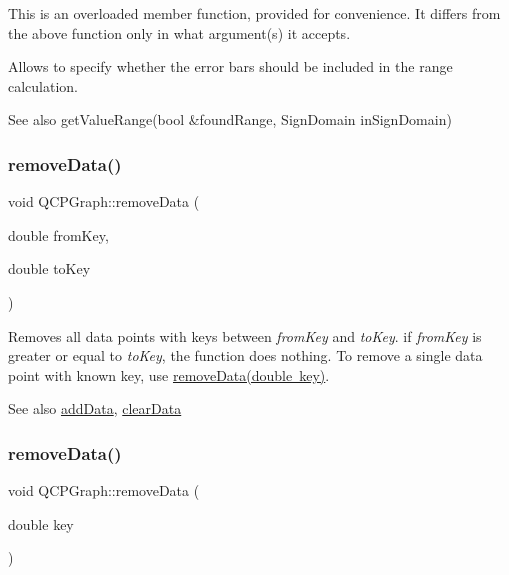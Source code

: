 This is an overloaded member function, provided for convenience. It differs from the above function only in what argument(s) it accepts.

Allows to specify whether the error bars should be included in the range calculation.

\begin{DoxySeeAlso}{See also}
get\+Value\+Range(bool \&found\+Range, Sign\+Domain in\+Sign\+Domain) 
\end{DoxySeeAlso}
\mbox{\label{class_q_c_p_graph_a4a0fde50b7db9db0a85b5c5b6b10098f}} 
\subsubsection{\texorpdfstring{remove\+Data()}{removeData()}\hspace{0.1cm}{\footnotesize\ttfamily [1/2]}}
{\footnotesize\ttfamily void Q\+C\+P\+Graph\+::remove\+Data (\begin{DoxyParamCaption}\item[{double}]{from\+Key,  }\item[{double}]{to\+Key }\end{DoxyParamCaption})}

Removes all data points with keys between {\itshape from\+Key} and {\itshape to\+Key}. if {\itshape from\+Key} is greater or equal to {\itshape to\+Key}, the function does nothing. To remove a single data point with known key, use \mbox{\hyperlink{class_q_c_p_graph_a4a706020b4318f118381648ef18aca3f}{remove\+Data(double key)}}.

\begin{DoxySeeAlso}{See also}
\mbox{\hyperlink{class_q_c_p_graph_aa5c6181d84db72ce4dbe9dc15a34ef4f}{add\+Data}}, \mbox{\hyperlink{class_q_c_p_graph_ad4e94a4e44e5e76fbec81a72a977157d}{clear\+Data}} 
\end{DoxySeeAlso}
\mbox{\label{class_q_c_p_graph_a4a706020b4318f118381648ef18aca3f}} 
\subsubsection{\texorpdfstring{remove\+Data()}{removeData()}\hspace{0.1cm}{\footnotesize\ttfamily [2/2]}}
{\footnotesize\ttfamily void Q\+C\+P\+Graph\+::remove\+Data (\begin{DoxyParamCaption}\item[{double}]{key }\end{DoxyParamCaption})}


